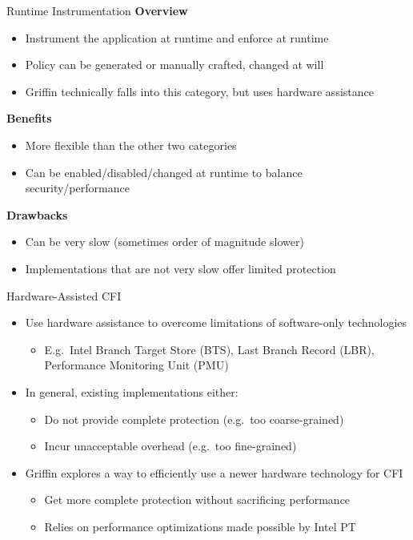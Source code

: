 \documentclass[12pt, dvipsnames, aspectratio=169]{beamer}
\newcommand{\red}[1]{{\color{red}#1}}
\newcommand{\blue}[1]{{\color{blue}#1}}
\begin{document}
\begin{frame}[c]{Runtime Instrumentation}{}
  {\bf Overview}
  \begin{itemize}
    \item Instrument the application at runtime and enforce at runtime
    \item Policy can be generated or manually crafted, changed at will
    \item Griffin technically falls into this category, but uses hardware assistance
  \end{itemize}

  \vfill
  {\bf \blue{Benefits}}
  \begin{itemize}
    \item More flexible than the other two categories
    \item Can be enabled/disabled/changed at runtime to balance security/performance
  \end{itemize}

  \vfill
  {\bf \red{Drawbacks}}
  \begin{itemize}
    \item Can be very slow (sometimes order of magnitude slower)
    \item Implementations that are not very slow offer limited protection
  \end{itemize}
\end{frame}

\begin{frame}[c]{Hardware-Assisted CFI}{}
  \begin{itemize}
    \item Use hardware assistance to overcome limitations of software-only technologies
    \begin{itemize}
      \item E.g.~Intel Branch Target Store (BTS), Last Branch Record (LBR), Performance Monitoring Unit (PMU)
    \end{itemize}

    \vfill
    \item In general, existing implementations either:
    \begin{itemize}
      \item Do not provide complete protection (e.g.~too coarse-grained)
      \item Incur unacceptable overhead (e.g.~too fine-grained)
    \end{itemize}

    \vfill
    \item Griffin explores a way to efficiently use a newer hardware technology for CFI
    \begin{itemize}
      \item Get more complete protection without sacrificing performance
      \item Relies on performance optimizations made possible by Intel PT
    \end{itemize}
  \end{itemize}
\end{frame}
\end{document}
